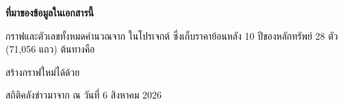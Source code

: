 \documentclass[11pt]{article}
\begin{document}
\vspace{2em}
\begin{keypoint}
\textbf{ที่มาของข้อมูลในเอกสารนี้}

กราฟและตัวเลขทั้งหมดคำนวณจาก  ในโปรเจกต์
ซึ่งเก็บราคาย้อนหลัง 10 ปีของหลักทรัพย์ 28 ตัว (71{,}056 แถว) ต้นทางคือ 

สร้างกราฟใหม่ได้ด้วย 

สถิติคลังข่าวมาจาก  ณ วันที่ 6 สิงหาคม 2026
\end{keypoint}
\end{document}
